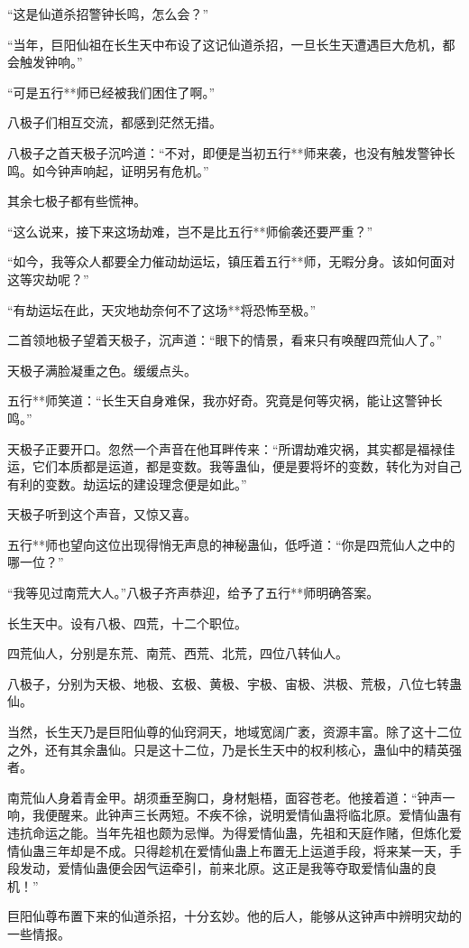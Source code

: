 \begin{this_body}
“这是仙道杀招警钟长鸣，怎么会？”

“当年，巨阳仙祖在长生天中布设了这记仙道杀招，一旦长生天遭遇巨大危机，都会触发钟响。”

“可是五行**师已经被我们困住了啊。”

八极子们相互交流，都感到茫然无措。

八极子之首天极子沉吟道：“不对，即便是当初五行**师来袭，也没有触发警钟长鸣。如今钟声响起，证明另有危机。”

其余七极子都有些慌神。

“这么说来，接下来这场劫难，岂不是比五行**师偷袭还要严重？”

“如今，我等众人都要全力催动劫运坛，镇压着五行**师，无暇分身。该如何面对这等灾劫呢？”

“有劫运坛在此，天灾地劫奈何不了这场**将恐怖至极。”

二首领地极子望着天极子，沉声道：“眼下的情景，看来只有唤醒四荒仙人了。”

天极子满脸凝重之色。缓缓点头。

五行**师笑道：“长生天自身难保，我亦好奇。究竟是何等灾祸，能让这警钟长鸣。”

天极子正要开口。忽然一个声音在他耳畔传来：“所谓劫难灾祸，其实都是福禄佳运，它们本质都是运道，都是变数。我等蛊仙，便是要将坏的变数，转化为对自己有利的变数。劫运坛的建设理念便是如此。”

天极子听到这个声音，又惊又喜。

五行**师也望向这位出现得悄无声息的神秘蛊仙，低呼道：“你是四荒仙人之中的哪一位？”

“我等见过南荒大人。”八极子齐声恭迎，给予了五行**师明确答案。

长生天中。设有八极、四荒，十二个职位。

四荒仙人，分别是东荒、南荒、西荒、北荒，四位八转仙人。

八极子，分别为天极、地极、玄极、黄极、宇极、宙极、洪极、荒极，八位七转蛊仙。

当然，长生天乃是巨阳仙尊的仙窍洞天，地域宽阔广袤，资源丰富。除了这十二位之外，还有其余蛊仙。只是这十二位，乃是长生天中的权利核心，蛊仙中的精英强者。

南荒仙人身着青金甲。胡须垂至胸口，身材魁梧，面容苍老。他接着道：“钟声一响，我便醒来。此钟声三长两短。不疾不徐，说明爱情仙蛊将临北原。爱情仙蛊有违抗命运之能。当年先祖也颇为忌惮。为得爱情仙蛊，先祖和天庭作赌，但炼化爱情仙蛊三年却是不成。只得趁机在爱情仙蛊上布置无上运道手段，将来某一天，手段发动，爱情仙蛊便会因气运牵引，前来北原。这正是我等夺取爱情仙蛊的良机！”

巨阳仙尊布置下来的仙道杀招，十分玄妙。他的后人，能够从这钟声中辨明灾劫的一些情报。


\end{this_body}
